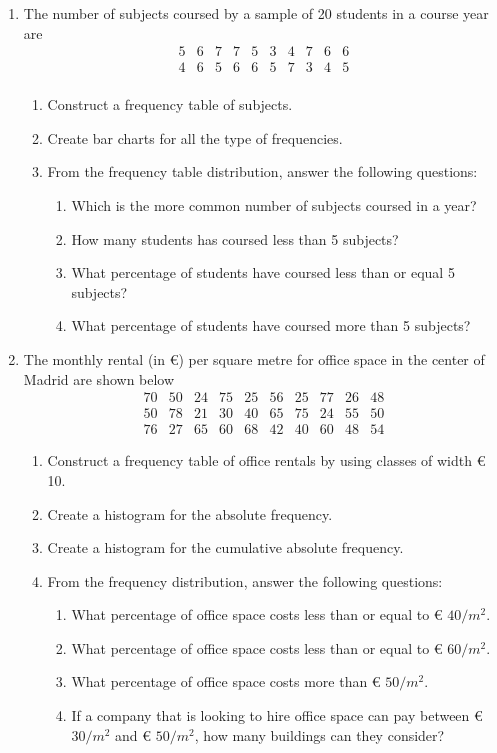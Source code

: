 \begin{enumerate}[leftmargin=*,resume]
\item The number of subjects coursed by a sample of 20 students in a course year are
\[
\begin{array}{cccccccccc}
5 & 6 & 7 & 7 & 5 & 3 & 4 & 7 & 6 & 6\\
4 & 6 & 5 & 6 & 6 & 5 & 7 & 3 & 4 & 5 \\
\end{array}
\]
\begin{enumerate}
\item Construct a frequency table of subjects.
\item Create bar charts for all the type of frequencies. 
\item From the frequency table distribution, answer the following questions:
\begin{enumerate}
\item Which is the more common number of subjects coursed in a year?
\item How many students has coursed less than 5 subjects?
\item What percentage of students have coursed less than or equal 5 subjects?
\item What percentage of students have coursed more than 5 subjects?
\end{enumerate}
\end{enumerate}


\item The monthly rental (in €) per square metre for office space in the center of Madrid are shown below
\[
\begin{array}{cccccccccc}
70 & 50 & 24 & 75 & 25 & 56 & 25 & 77 & 26 & 48 \\
50 & 78 & 21 & 30 & 40 & 65 & 75 & 24 & 55 & 50 \\
76 & 27 & 65 & 60 & 68 & 42 & 40 & 60 & 48 & 54
\end{array}
\]

\begin{enumerate}
\item Construct a frequency table of office rentals by using classes of width € 10. 
\item Create a histogram for the absolute frequency.
\item Create a histogram for the cumulative absolute frequency. 
\item From the frequency distribution, answer the following questions:
\begin{enumerate}
\item What percentage of office space costs less than or equal to € $40/m^2$.
\item What percentage of office space costs less than or equal to € $60/m^2$.
\item What percentage of office space costs more than € $50/m^2$.
\item If a company that is looking to hire office space can pay between € $30/m^2$ and € $50/m^2$, how many buildings
can they consider?
\end{enumerate}
\end{enumerate}


\end{enumerate}
